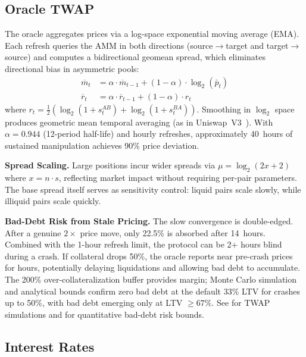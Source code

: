 \documentclass[10pt,a4paper,twocolumn]{article}
\theoremstyle{definition}
\theoremstyle{plain}
\theoremstyle{remark}
\begin{document}
\subsection{Oracle TWAP}
\label{subsec:oracle-twap}

The oracle aggregates prices via a log-space exponential moving average (EMA). Each refresh queries the AMM in both directions (source$\to$target and target$\to$source) and computes a bidirectional geomean spread, which eliminates directional bias in asymmetric pools:
\begin{align}
\overline{m}_t &= \alpha \cdot \overline{m}_{t-1} + (1{-}\alpha) \cdot \log_2(\bar{p}_t) \\
\overline{r}_t &= \alpha \cdot \overline{r}_{t-1} + (1{-}\alpha) \cdot r_t
\end{align}
where $r_t = \frac{1}{2}(\log_2(1+s^{AB}_t) + \log_2(1+s^{BA}_t))$. Smoothing in $\log_2$ space produces geometric mean temporal averaging (as in Uniswap~V3~\cite{uniswap2021}). With $\alpha = 0.944$ (12-period half-life) and hourly refreshes, approximately 40~hours of sustained manipulation achieves 90\% price deviation.

\textbf{Spread Scaling.} Large positions incur wider spreads via $\mu = \log_2(2x + 2)$ where $x = n \cdot s$, reflecting market impact without requiring per-pair parameters. The base spread itself serves as sensitivity control: liquid pairs scale slowly, while illiquid pairs scale quickly.

\textbf{Bad-Debt Risk from Stale Pricing.} The slow convergence is double-edged. After a genuine $2\times$ price move, only 22.5\% is absorbed after 14~hours. Combined with the 1-hour refresh limit, the protocol can be 2+ hours blind during a crash. If collateral drops 50\%, the oracle reports near pre-crash prices for hours, potentially delaying liquidations and allowing bad debt to accumulate. The 200\% over-collateralization buffer provides margin; Monte Carlo simulation and analytical bounds confirm zero bad debt at the default 33\% LTV for crashes up to 50\%, with bad debt emerging only at LTV $\geq 67\%$. See \cite[\S F]{apx} for TWAP simulations and \cite[\S G]{apx} for quantitative bad-debt risk bounds.

\subsection{Interest Rates}
\label{subsec:interest-rates}
\end{document}
